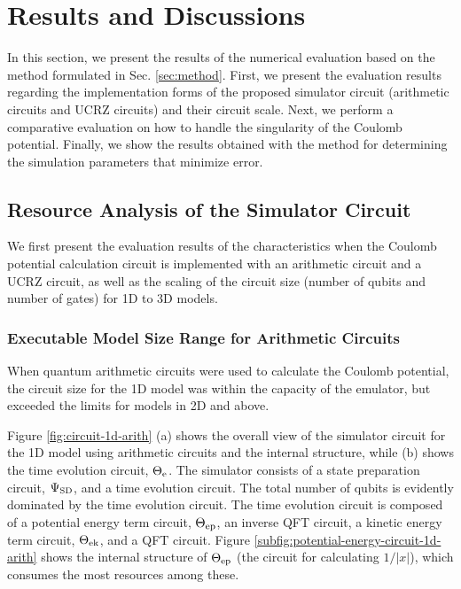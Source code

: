 \documentclass[jctc-draft.tex]{subfiles}
\begin{document}
\section{Results and Discussions}
In this section, we present the results of the numerical evaluation based on the
method formulated in Sec. \ref{sec:method}. First, we present the evaluation results regarding
the implementation forms of the proposed simulator circuit (arithmetic circuits
and UCRZ circuits) and their circuit scale. Next, we perform a comparative
evaluation on how to handle the singularity of the Coulomb potential. Finally,
we show the results obtained with the method for determining the simulation
parameters that minimize error.

\subsection{Resource Analysis of the Simulator Circuit}
\label{subsec:circuit-configuration-results}
We first present the evaluation results of the characteristics when the Coulomb
potential calculation circuit is implemented with an arithmetic circuit and a
UCRZ circuit, as well as the scaling of the circuit size (number of qubits and
number of gates) for 1D to 3D models.

\subsubsection{Executable Model Size Range for Arithmetic Circuits}
\label{subsubsec:arithmetic-circuit-configuration-results}
When quantum arithmetic circuits were used to calculate the Coulomb potential,
the circuit size for the 1D model was within the capacity of the emulator, but
exceeded the limits for models in 2D and above.

Figure \ref{fig:circuit-1d-arith} (a) shows the overall view of the simulator
circuit for the 1D model using arithmetic circuits and the internal structure,
while (b) shows the time evolution circuit, $\Theta_{\mathrm{e}}$. The simulator consists of
a state preparation circuit, $\Psi_{\mathrm{SD}}$, and a time evolution circuit. The total
number of qubits is evidently dominated by the time evolution circuit. The time
evolution circuit is composed of a potential energy term circuit, $\Theta_{\mathrm{ep}}$, an
inverse QFT circuit, a kinetic energy term circuit, $\Theta_{\mathrm{ek}}$, and a QFT
circuit. Figure \ref{subfig:potential-energy-circuit-1d-arith} shows the
internal structure of $\Theta_{\mathrm{ep}}$ (the circuit for calculating $1/|x|$), which
consumes the most resources among these.
\end{document}
